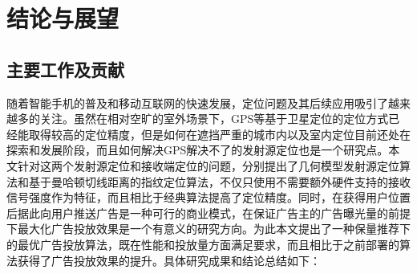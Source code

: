 \chapter{结论与展望}
\label{cha:conclusion}

\section{主要工作及贡献}

随着智能手机的普及和移动互联网的快速发展，定位问题及其后续应用吸引了越来越多的关注。虽然在相对空旷的室外场景下，GPS等基于卫星定位的定位方式已经能取得较高的定位精度，但是如何在遮挡严重的城市内以及室内定位目前还处在探索和发展阶段，而且如何解决GPS解决不了的发射源定位也是一个研究点。本文针对这两个发射源定位和接收端定位的问题，分别提出了几何模型发射源定位算法和基于曼哈顿切线距离的指纹定位算法，不仅只使用不需要额外硬件支持的接收信号强度作为特征，而且相比于经典算法提高了定位精度。同时，在获得用户位置后据此向用户推送广告是一种可行的商业模式，在保证广告主的广告曝光量的前提下最大化广告投放效果是一个有意义的研究方向。为此本文提出了一种保量推荐下的最优广告投放算法，既在性能和投放量方面满足要求，而且相比于之前部署的算法获得了广告投放效果的提升。具体研究成果和结论总结如下：
